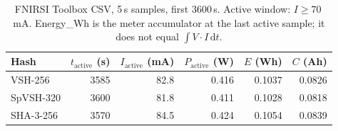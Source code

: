 \begin{table}[ht]
\caption{FNIRSI Toolbox CSV, 5\,s samples, first 3600\,s. Active window: $I\geq 70$\,mA. Energy\_Wh is the meter accumulator at the last active sample; it does not equal $\int V\cdot I\,\mathrm{d}t$.}
\label{tab:fnb58-official}
\centering
\begin{tabular}{@{}lrrrrr@{}}
\toprule
Hash & $t_\mathrm{active}$ (s) & $I_\mathrm{active}$ (mA) & $P_\mathrm{active}$ (W) & $E$ (Wh) & $C$ (Ah) \\
\midrule
VSH-256 & 3585 & 82.8 & 0.416 & 0.1037 & 0.0826 \\
SpVSH-320 & 3600 & 81.8 & 0.411 & 0.1028 & 0.0818 \\
SHA-3-256 & 3570 & 84.5 & 0.424 & 0.1054 & 0.0839 \\
\bottomrule
\end{tabular}
\end{table}
